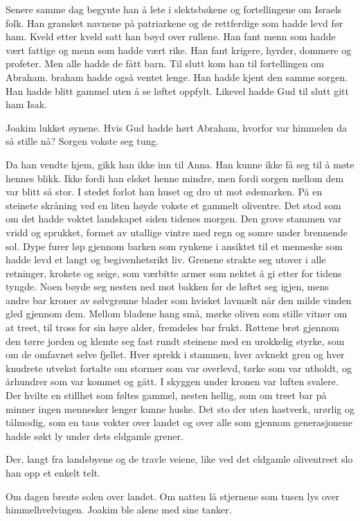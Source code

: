 Senere samme dag begynte han å lete i slektsbøkene og
fortellingene om Israels folk. Han gransket navnene på
patriarkene og de rettferdige som hadde levd før ham.
Kveld etter kveld satt han bøyd over rullene.
Han fant menn som hadde vært fattige og menn som hadde vært rike.
Han fant krigere, hyrder, dommere og profeter.
Men alle hadde de fått barn.
Til slutt kom han til fortellingen om Abraham.
braham hadde også ventet lenge. Han hadde kjent den samme sorgen.
Han hadde blitt gammel uten å se løftet oppfylt.
Likevel hadde Gud til slutt gitt ham Isak.

Joakim lukket øynene.
Hvis Gud hadde hørt Abraham, hvorfor var himmelen da så stille nå?
Sorgen vokste seg tung.

Da han vendte hjem, gikk han ikke inn til Anna.
Han kunne ikke få seg til å møte hennes blikk.
Ikke fordi han elsket henne mindre, men fordi sorgen
mellom dem var blitt så stor.
I stedet forlot han huset og dro ut mot ødemarken.
På  en steinete skråning ved en liten høyde vokste et gammelt oliventre.
Det stod som om
det hadde voktet landskapet siden tidenes morgen.
Den grove stammen var vridd og sprukket,
formet av utallige vintre med regn og somre under brennende sol.
Dype furer løp gjennom barken som rynkene i ansiktet til et menneske
som hadde levd et langt og begivenhetsrikt liv. 
Grenene strakte seg utover i alle retninger, krokete og seige,
som værbitte armer som nektet å gi etter for tidens tyngde.
Noen bøyde seg nesten ned mot bakken før de løftet seg igjen,
mens andre bar kroner av sølvgrønne blader som hvisket lavmælt når
den milde vinden gled gjennom dem. Mellom bladene hang små,
mørke oliven som stille vitner om at treet, til tross for sin høye alder,
fremdeles bar frukt. 
Røttene brøt gjennom den tørre jorden og
klemte seg fast rundt steinene med en urokkelig styrke,
som om de omfavnet selve fjellet. Hver sprekk i stammen,
hver avknekt gren og hver
knudrete utvekst fortalte om stormer som var overlevd, tørke som var utholdt,
og århundrer som var kommet og gått. I skyggen under kronen var luften svalere.
Der hvilte en stillhet som føltes gammel, nesten hellig,
som om treet bar på minner
ingen mennesker lenger kunne huske. Det sto der uten hastverk,
urørlig og tålmodig,
som en taus vokter over landet og over alle som gjennom generasjonene
hadde søkt ly under dets eldgamle grener.

Der, langt fra landsbyene og de travle veiene, like ved
det eldgamle oliventreet
slo han opp et enkelt telt.


Om dagen brente solen over landet.
Om natten lå stjernene som tusen lys over himmelhvelvingen.
Joakim ble alene med sine tanker.

